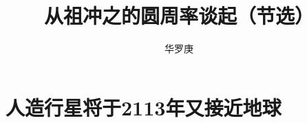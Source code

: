 \documentclass{ctexart}
\title{从祖冲之的圆周率谈起（节选）}
\author{华罗庚}
\date{}
\begin{document}
\maketitle



\section{人造行星将于2113年又接近地球}


%     
\end{document}
